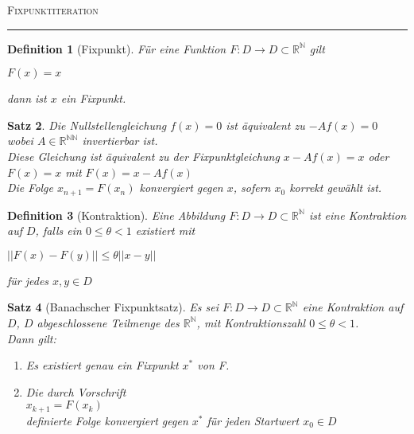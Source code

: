 \documentclass[a4paper]{article}
\newcounter{Sec}
\theoremstyle{marginbreak}
\newtheorem{definition}{Definition}[Sec]
\newtheorem{satz}[definition]{Satz}
\newcommand{\sep}{%
	\rule{\textwidth}{0.3pt}%
	\stepcounter{Sec}%
}
\begin{document}
	\textsc{Fixpunktiteration}
	\sep
	\begin{definition}[Fixpunkt]
		Für eine Funktion $F : D \to D \subset \mathbb{R}^\mathbb{N}$ gilt
		\begin{description}
			\item $F(x) = x$
		\end{description}
		dann ist $x$ ein Fixpunkt.
	\end{definition}

	\begin{satz}
		Die Nullstellengleichung $f(x) = 0$ ist äquivalent zu $-Af(x) = 0$ wobei $A \in \mathbb{R}^{\mathbb{N}\mathbb{N}}$ invertierbar ist.\\
		Diese Gleichung ist äquivalent zu der Fixpunktgleichung $x - Af(x) = x$ oder $F(x)=x$ mit $F(x) = x - Af(x)$\\
		
		Die Folge $x_{n+1} = F(x_n)$ konvergiert gegen $x$, sofern $x_0$ korrekt gewählt ist.
	\end{satz}

	\begin{definition}[Kontraktion]
		Eine Abbildung $F : D \to D \subset \mathbb{R}^\mathbb{N}$ ist eine Kontraktion auf $D$, falls ein $0 \leq \theta < 1$ existiert mit
		\begin{description}
			\item $||F(x) - F(y)|| \leq \theta ||x - y||$
		\end{description}
		für jedes $x, y \in D$
	\end{definition}

	\begin{satz}[Banachscher Fixpunktsatz]
		Es sei $F : D \to D \subset \mathbb{R}^\mathbb{N}$ eine Kontraktion auf $D$, $D$ abgeschlossene Teilmenge des $\mathbb{R}^\mathbb{N}$, mit Kontraktionszahl $0 \leq \theta < 1$. \\
		Dann gilt:
		\begin{enumerate}
			\item Es existiert genau ein Fixpunkt $x^*$ von F.
			\item Die durch Vorschrift\\
				$x_{k+1} = F(x_k)$ \\
			definierte Folge konvergiert gegen $x^*$ für jeden Startwert $x_0 \in D$ 
		\end{enumerate}
	\end{satz}
\end{document}
